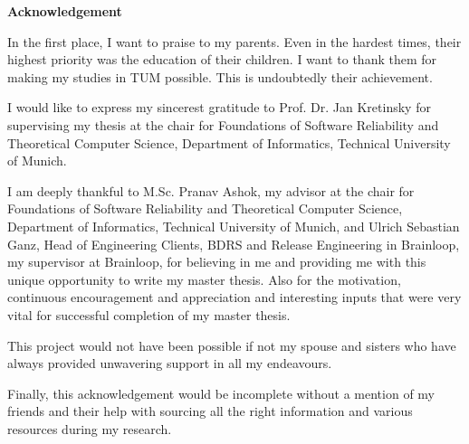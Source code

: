 
\newpage
{}
\thispagestyle{empty}
\hoffset=0mm
\begin{center}
    {\Large \bf Acknowledgement}
\end{center}

\vspace{1cm}

In the first place, I want to praise to my parents. Even in the hardest times, their highest priority was the education of their children. I want to thank them for making my studies in TUM possible. This is undoubtedly their achievement.

I would like to express my sincerest gratitude to Prof. Dr. Jan Kretinsky for supervising my thesis at the chair for Foundations of Software Reliability and Theoretical Computer Science, Department of Informatics, Technical University of Munich. 

I am deeply thankful to M.Sc. Pranav Ashok, my advisor at the chair for Foundations of Software Reliability and Theoretical Computer Science, Department of Informatics, Technical University of Munich, and Ulrich Sebastian Ganz, Head of Engineering Clients, BDRS and Release Engineering in Brainloop, my supervisor at Brainloop, for believing in me and providing me with this unique opportunity to write my master thesis. Also for the motivation, continuous encouragement and appreciation and interesting inputs that were very vital for successful completion of my master thesis.

This project would not have been possible if not my spouse and sisters who have always provided unwavering support in all my endeavours.

Finally, this acknowledgement would be incomplete without a mention of my friends and their help with sourcing all the right information and various resources during my research.

